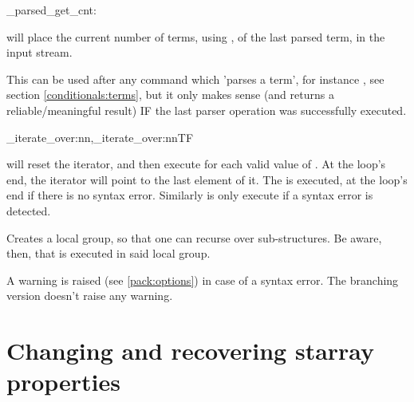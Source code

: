 \documentclass[10pt]{article}
\begin{document}
\begin{codedescribe}[code,EXP,new=2023/05/20]{\starray_parsed_get_cnt:}
\begin{codesyntax}%
\end{codesyntax}
 will place the current number of terms, using , of the last parsed term, in the input stream.
\end{codedescribe}
\begin{tsremark}
This can be used after any command which 'parses a term', for instance , see section \ref{conditionals:terms}, but it only makes sense (and returns a reliable/meaningful result) IF the last parser operation was successfully executed.
\end{tsremark}

\begin{codedescribe}[code,new=2023/11/04]{\starray_iterate_over:nn,\starray_iterate_over:nnTF}
\begin{codesyntax}%
\end{codesyntax}
 will reset the  iterator, and then execute  for each valid value of . At the loop's end, the  iterator will point to the last element of it. The  is executed, at the loop's end if there is no syntax error. Similarly  is only execute if a syntax error is detected.
\end{codedescribe}
\begin{tsremark}
 Creates a local group, so that one can recurse over sub-structures. Be aware, then, that  is executed in said local group.
\end{tsremark}
\begin{tsremark}
A warning is raised (see \ref{pack:options}) in case of a  syntax error. The branching version doesn't raise any warning.
\end{tsremark}



\section{Changing and recovering starray properties}\label{pack:get/set}
\end{document}

